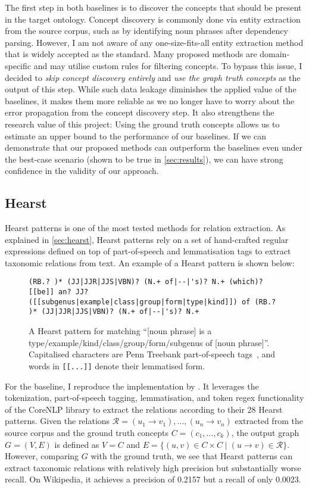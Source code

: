The first step in both baselines is to discover the concepts that should be present in the target ontology. Concept discovery is commonly done via entity extraction from the source corpus, such as by identifying noun phrases after dependency parsing. However, I am not aware of any one-size-fits-all entity extraction method that is widely accepted as the standard. Many proposed methods are domain-specific and may utilise custom rules for filtering concepts.  To bypass this issue, I decided to \emph{skip concept discovery entirely} and \emph{use the graph truth concepts} as the output of this step. While such data leakage diminishes the applied value of the baselines, it makes them more reliable as we no longer have to worry about the error propagation from the concept discovery step. It also strengthens the research value of this project: Using the ground truth concepts allows us to estimate an upper bound to the performance of our baselines. If we can demonstrate that our proposed methods can outperform the baselines even under the best-case scenario (shown to be true in \cref{sec:results}), we can have strong confidence in the validity of our approach.

\subsection{Hearst}
Hearst patterns \cite{hearst1998automated} is one of the most tested methods for relation extraction. As explained in \cref{sec:hearst}, Hearst patterns rely on a set of hand-crafted regular expressions defined on top of part-of-speech and lemmatisation tags to extract taxonomic relations from text. An example of a Hearst pattern is shown below:

\begin{figure}[h]
    \begin{lstlisting}[frame=single]
(RB.? )* (JJ|JJR|JJS|VBN)? (N.+ of|--|'s)? N.+ (which)? [[be]] an? JJ? ([[subgenus|example|class|group|form|type|kind]]) of (RB.? )* (JJ|JJR|JJS|VBN)? (N.+ of|--|'s)? N.+
\end{lstlisting}
    \caption{A Hearst pattern for matching ``[noun phrase] is a type/example/kind/class/group/form/subgenus of [noun phrase]''. Capitalised characters are Penn Treebank part-of-speech tags~\cite{marcus1993building}, and words in \texttt{[[...]]} denote their lemmatised form.}
\end{figure}

For the baseline, I reproduce the implementation by \citet{roller2018hearst}. It leverages the tokenization, part-of-speech tagging, lemmatisation, and token regex functionality of the CoreNLP library \cite{manning2014stanford} to extract the relations according to their 28 Hearst patterns. Given the relations $\mathcal{R} = (u_1 \to v_1), \dots, (u_n \to v_n)$ extracted from the source corpus and the ground truth concepts $C = (c_1, \dots, c_k)$, the output graph $G = (V, E)$ is defined as $V = C$ and $E = \{(u, v) \in C \times C \mid (u \to v) \in \mathcal{R}\}$. However, comparing $G$ with the ground truth, we see that Hearst patterns can extract taxonomic relations with relatively high precision but substantially worse recall. On Wikipedia, it achieves a precision of 0.2157 but a recall of only 0.0023.

